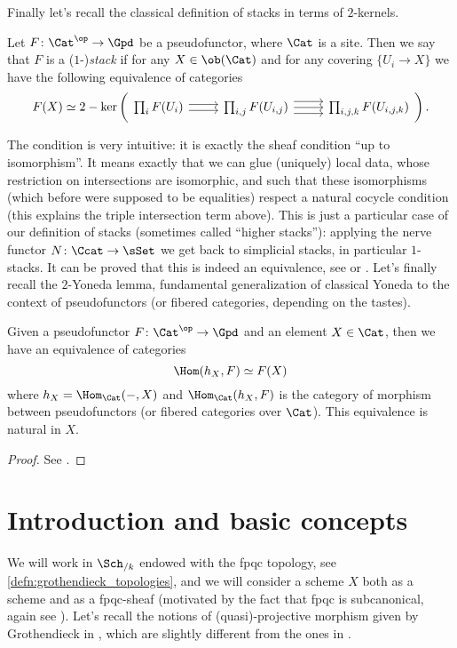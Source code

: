         Finally let's recall the classical definition of stacks in terms of $2$-kernels.
        \begin{defn}
            \label{defn:stack_2_kernel}
            Let $F\colon \Cat^{\op} \to \Gpd$ be a pseudofunctor, where $\Cat$ is a site. Then we say that $F$ is a ($1$-)\emph{stack} if for any $X \in \ob(\Cat)$ and for any covering $\{U_i \to X\}$ we have the following equivalence of categories
            \[
                F(X) \simeq 2-\ker\left(
                    \begin{tikzcd}
                            \prod_i F(U_i) \ar[r, shift right] \ar[r, shift left] & \prod_{i,j} F(U_{i,j}) \ar[r] \ar[r, shift left=2] \ar[r, shift right=2] & \prod_{i,j,k} F(U_{i,j,k})
                    \end{tikzcd}
            \right). 
            \]
        \end{defn}
        The condition is very intuitive: it is exactly the sheaf condition ``up to isomorphism''. It means exactly that we can glue (uniquely) local data, whose restriction on intersections are isomorphic, and such that these isomorphisms (which before were supposed to be equalities) respect a natural cocycle condition (this explains the triple intersection term above).
        This is just a particular case of our definition of stacks (sometimes called ``higher stacks''): applying the nerve functor $N\colon \Ccat \to \sSet$ we get back to simplicial stacks, in particular $1$-stacks. It can be proved that this is indeed an equivalence, see \cite[Thm~3.5.2]{Hennion:memoire} or \cite[2.1.2]{ToVe:hag2}.
        Let's finally recall the $2$-Yoneda lemma, fundamental generalization of classical Yoneda to the context of pseudofunctors (or fibered categories, depending on the tastes).

        \begin{lemma}
            \label{lemma:2Yoneda}
            Given a pseudofunctor $F\colon \Cat^{\op} \to \Gpd$ and an element $X \in \Cat$, then we have an equivalence of categories \[\Hom(h_X, F) \simeq F(X) \] where $h_X = \Hom_{\Cat}(-, X)$ and $\Hom_{\Cat}(h_X, F)$ is the category of morphism between pseudofunctors (or fibered categories over $\Cat$). This equivalence is natural in $X$.
        \end{lemma}
        \begin{proof}
            See \cite[3.6.2]{Vist:desc}.
        \end{proof}

    \section{Introduction and basic concepts}
        We will work in $\Sch_{/k}$ endowed with the fpqc topology, see \cref{defn:grothendieck_topologies}, and we will consider a scheme $X$ both as a scheme and as a fpqc-sheaf (motivated by the fact that fpqc is subcanonical, again see \cite[Thm~2.55]{Vist:desc}).
        Let's recall the notions of (quasi)-projective morphism given by Grothendieck in \cite[5.3, 5.5]{EGA2}, which are slightly different from the ones in \cite{Hart}.

